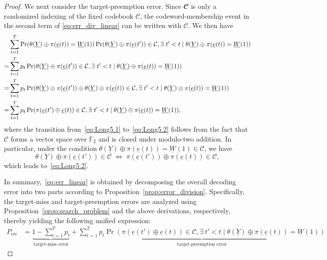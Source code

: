 \documentclass[letterpaper,draftclsnofoot,onecolumn]{IEEEtran}
\begin{document}
\begin{proof}
    
    We next consider the target-preemption error. Since $\mathbfcal{C}$ is only a randomized indexing of the fixed codebook $\mathcal{C}$, the codeword-membership event in the second term of \eqref{eq:err_div_linear} can be written with $\mathcal{C}$. We then have
    \begin{align}
        & \sum_{t=1}^{T}\Pr(\theta(\underline{Y})\oplus \pi(\underline{e}(t)) = \underline{W}(1))\Pr(\theta(\underline{Y})\oplus \pi(\underline{e}(t'))\in \mathcal{C},\exists\ t'< t \mid \theta(\underline{Y})\oplus \pi(\underline{e}(t))=\underline{W}(1)) \notag\\
        = & \sum_{t=1}^{T}p_{t}\Pr(\theta(\underline{Y})\oplus \pi(\underline{e}(t'))\in \mathcal{C},\exists\ t'< t \mid \theta(\underline{Y})\oplus \pi(\underline{e}(t))=\underline{W}(1)) \label{eq:Long5.1}\\
        = & \sum_{t=1}^{T}p_{t}\Pr(\theta(\underline{Y})\oplus \pi(\underline{e}(t')) \oplus\theta(\underline{Y})\oplus \pi(\underline{e}(t)) \in \mathcal{C},\exists\ t'< t \mid \theta(\underline{Y})\oplus \pi(\underline{e}(t))=\underline{W}(1)) \label{eq:Long5.2}\\
        = & \sum_{t=1}^{T}p_{t}\Pr(\pi(\underline{e}(t') \oplus \underline{e}(t)) \in \mathcal{C},\exists\ t'< t \mid \theta(\underline{Y})\oplus \pi(\underline{e}(t))=\underline{W}(1)), \label{eq:Long5.3}
    \end{align}
    where the transition from~\eqref{eq:Long5.1} to~\eqref{eq:Long5.2} follows from the fact that $\mathcal{C}$ forms a vector space over $\mathbb{F}_2$ and is closed under modulo-two addition. In particular, under the condition $\theta(\underline{Y})\oplus \pi(\underline{e}(t))=\underline{W}(1)\in \mathcal{C}$, we have
    \begin{equation}
    \theta(\underline{Y})\oplus \pi(\underline{e}(t')) \in \mathcal{C}
    \;\Longleftrightarrow\;
    \pi(\underline{e}(t')) \oplus \pi(\underline{e}(t)) \in \mathcal{C},
    \end{equation}
    which leads to~\eqref{eq:Long5.2}.
    
    In summary,~\eqref{eq:err_linear} is obtained by decomposing the overall decoding error into two parts according to Proposition~\ref{prop:error_division}. Specifically, the target-miss and target-preemption errors are analyzed using Proposition~\ref{prop:search_problem} and the above derivations, respectively, thereby yielding the following unified expression:
    \begin{align}
        P_{\text{err}} & = \underbrace{1 - \sum_{t=1}^{T}p_t}_{\text{target-miss error}} +  \underbrace{\sum_{t=1}^{T}p_{t}\Pr(\pi(\underline{e}(t') \oplus \underline{e}(t)) \in \mathcal{C},\exists\ t'< t \mid \theta(\underline{Y})\oplus \pi(\underline{e}(t))=\underline{W}(1))}_{\text{target-preemption error}} 
    \end{align}


\end{proof}
\end{document}
